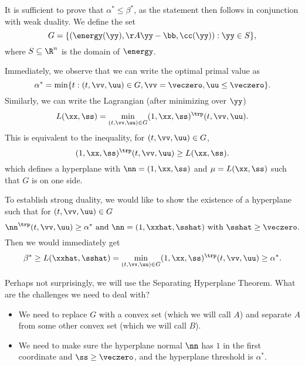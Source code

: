 It is sufficient to prove that $\alpha^* \leq \beta^*$, as the statement then follows in conjunction with weak duality.
We define the set
\begin{equation*} G = \{(\energy(\yy), \AA\yy - \bb, \cc(\yy)) : \yy \in S \}, \end{equation*}
where $S \subseteq \R^n$ is the domain of $\energy$.

Immediately, we observe that we can write the optimal primal value as
\begin{equation*} \alpha^* = \min \{t:(t,\vv,\uu) \in G, \vv = \veczero, \uu \leq \veczero\}. \end{equation*}
Similarly, we can write the Lagrangian (after minimizing over $\yy$)
\begin{equation*} L(\xx, \ss) = \min_{(t,\vv,\uu) \in G} (1, \xx, \ss)^{\trp} (t, \vv, \uu). \end{equation*}
This is equivalent to the inequality, for $(t,\vv,\uu) \in G$,
\begin{equation*} (1, \xx, \ss)^{\trp}(t, \vv, \uu) \geq L(\xx, \ss). \end{equation*}
which defines a hyperplane with $\nn = (1,\xx,\ss)$ and $\mu = L(\xx,
\ss)$ such that $G$ is on one side.

To establish strong duality, we would like to show the existence of a
hyperplane such that for $(t,\vv,\uu) \in G$
\[
  \nn^{\trp}(t, \vv, \uu) \geq \alpha^* \text{ and } \nn = (1,\xxhat,\sshat)
  \text{ with } \sshat \geq \veczero.
\]
Then we would immediately get
\begin{equation*}
 \beta^* \geq L(\xxhat,\sshat)= \min_{(t,\vv,\uu) \in G} (1, \xx,
 \ss)^{\trp} (t, \vv, \uu) \geq \alpha^* .
\end{equation*}

Perhaps not surprisingly, we will use the Separating
Hyperplane Theorem.
What are the challenges we need to deal with?
\begin{itemize}
\item We need to replace $G$ with a convex set (which we will call
  $A$) and separate $A$ from some other convex set (which we will call $B$).
\item We need to make sure the hyperplane normal $\nn$ has $1$ in the first
  coordinate and $\ss \geq \veczero$, and the hyperplane threshold is $\alpha^*$.
\end{itemize}


